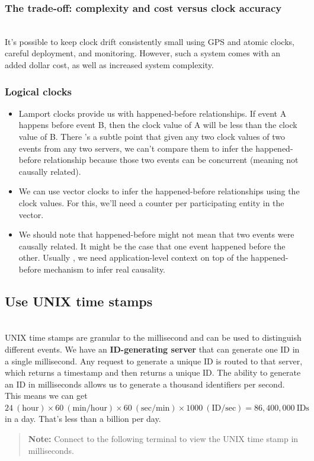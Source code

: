 \subsubsection{The trade-off: complexity and cost versus clock accuracy}\label{the-trade-off-complexity-and-cost-versus-clock-accuracy}
\\
It's possible to keep clock drift consistently small using GPS and atomic clocks, careful deployment, and monitoring. However, such a system comes with an added dollar cost, as well as increased system complexity.

\subsubsection{Logical clocks}\label{logical-clocks}

\begin{itemize}
\tightlist
\item
Lamport clocks provide us with happened-before relationships. If event A happens before event B, then the clock value of A will be less than the clock value of B. There 's a subtle point that given any two clock values of two events from any two servers, we can't compare them to infer the happened-before relationship because those two events can be concurrent (meaning not causally related).
\item
We can use vector clocks to infer the happened-before relationships using the clock values. For this, we'll need a counter per participating entity in the vector.
\item
We should note that happened-before might not mean that two events were causally related. It might be the case that one event happened before the other. Usually , we need application-level context on top of the happened-before mechanism to infer real causality.
\end{itemize}

\subsection{Use UNIX time stamps}\label{y4Lwdr0G_ewq8N2Bc7kKB}
\\
UNIX time stamps are granular to the millisecond and can be used to distinguish different events. We have an \textbf{ID-generating server} that can generate one ID in a single millisecond. Any request to generate a unique ID is routed to that server, which returns a timestamp and then returns a unique ID. The ability to generate an ID in milliseconds allows us to generate a thousand identifiers per second. This means we can get \protect{}\label{katex_inline_0gqG4w1ttqL-fCjZNsZnS}{{{\(24 \ (\text{hour}) \times 60 \ (\text{min/hour}) \times 60 \ (\text{sec/min}) \times 1000 \ (\text{ID/sec}) = 86{,}400{,}000 \ \text{IDs}\)}}} in a day. That's less than a billion per day.
\begin{quote}
\textbf{Note:} Connect to the following terminal to view the UNIX time stamp in milliseconds.
\end{quote}

